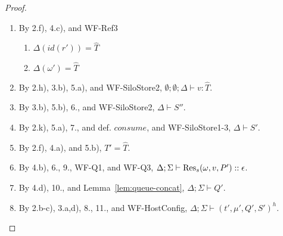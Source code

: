 \begin{proof}
\begin{itemize}
\begin{enumerate}
\item By 2.f), 4.c), and WF-Ref3
  \begin{enumerate}[label=(\alph*)]
  \item $\Delta(id(r')) = \hat{T}$
  \item $\Delta(\omega') = \hat{T}$
  \end{enumerate}
\item By 2.h), 3.b), 5.a), and WF-SiloStore2, $\emptyset ; \emptyset ; \Delta \vdash v : \hat{T}$.
\item By 3.b), 5.b), 6., and WF-SiloStore2, $\Delta \vdash S''$.
\item By 2.k), 5.a), 7., and def. $consume$, and WF-SiloStore1-3, $\Delta \vdash S'$.
\item By 2.f), 4.a), and 5.b), $T' = \hat{T}$.
\item By 4.b), 6., 9., WF-Q1, and WF-Q3, $\Delta ; \Sigma \vdash {\textrm{Res}_s(\omega, v, P')} :: \epsilon$.
\item By 4.d), 10., and Lemma~\ref{lem:queue-concat}, $\Delta ; \Sigma \vdash Q'$.
\item By 2.b-c), 3.a,d), 8., 11., and WF-HostConfig, $\Delta ; \Sigma \vdash (t', \mu', Q', S')^h$.
\end{enumerate}


\end{itemize}
\end{proof}
